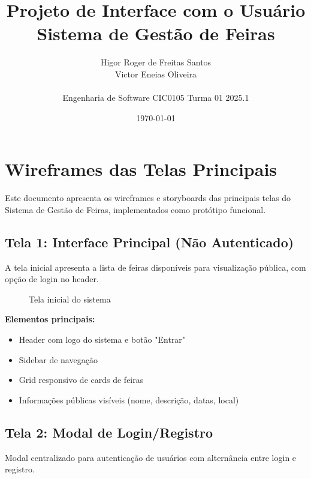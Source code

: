 \documentclass[12pt,a4paper]{article}
\title{\textbf{Projeto de Interface com o Usuário}\\
\large Sistema de Gestão de Feiras}
\author{Higor Roger de Freitas Santos \quad 221006440\\
Victor Eneias Oliveira \quad 221038364\\
\\
Engenharia de Software CIC0105 Turma 01 2025.1}
\date{\today}
\begin{document}
\maketitle
\tableofcontents
\newpage

\section{Wireframes das Telas Principais}

Este documento apresenta os wireframes e storyboards das principais telas do Sistema de Gestão de Feiras, implementados como protótipo funcional.

\subsection{Tela 1: Interface Principal (Não Autenticado)}

A tela inicial apresenta a lista de feiras disponíveis para visualização pública, com opção de login no header.

\begin{figure}[H]
\centering
{}
\caption{Tela inicial do sistema}
\label{fig:tela_inicial}
\end{figure}

\textbf{Elementos principais:}
\begin{itemize}
    \item Header com logo do sistema e botão "Entrar"
    \item Sidebar de navegação
    \item Grid responsivo de cards de feiras
    \item Informações públicas visíveis (nome, descrição, datas, local)
\end{itemize}

\subsection{Tela 2: Modal de Login/Registro}

Modal centralizado para autenticação de usuários com alternância entre login e registro.
\end{document}
